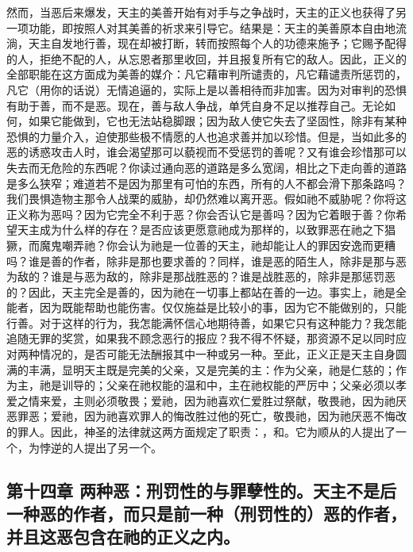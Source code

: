 然而，当恶后来爆发，天主的美善开始有对手与之争战时，天主的正义也获得了另一项功能，即按照人对其美善的祈求来引导它。结果是：天主的美善原本自由地流淌，天主自发地行善，现在却被打断，转而按照每个人的功德来施予；它赐予配得的人，拒绝不配的人，从忘恩者那里收回，并且报复所有它的敌人。因此，正义的全部职能在这方面成为美善的媒介：凡它藉审判所谴责的，凡它藉谴责所惩罚的，凡它（用你的话说）无情追逼的，实际上是以善相待而非加害。因为对审判的恐惧有助于善，而不是恶。现在，善与敌人争战，单凭自身不足以推荐自己。无论如何，如果它能做到，它也无法站稳脚跟；因为敌人使它失去了坚固性，除非有某种恐惧的力量介入，迫使那些极不情愿的人也追求善并加以珍惜。但是，当如此多的恶的诱惑攻击人时，谁会渴望那可以藐视而不受惩罚的善呢？又有谁会珍惜那可以失去而无危险的东西呢？你读过通向恶的道路是多么宽阔，相比之下走向善的道路是多么狭窄；难道若不是因为那里有可怕的东西，所有的人不都会滑下那条路吗？我们畏惧造物主那令人战栗的威胁，却仍然难以离开恶。假如祂不威胁呢？你将这正义称为恶吗？因为它完全不利于恶？你会否认它是善吗？因为它着眼于善？你希望天主成为什么样的存在？是否应该更愿意祂成为那样的，以致罪恶在祂之下猖獗，而魔鬼嘲弄祂？你会认为祂是一位善的天主，祂却能让人的罪因安逸而更糟吗？谁是善的作者，除非是那也要求善的？同样，谁是恶的陌生人，除非是那与恶为敌的？谁是与恶为敌的，除非是那战胜恶的？谁是战胜恶的，除非是那惩罚恶的？因此，天主完全是善的，因为祂在一切事上都站在善的一边。事实上，祂是全能者，因为既能帮助也能伤害。仅仅施益是比较小的事，因为它不能做别的，只能行善。对于这样的行为，我怎能满怀信心地期待善，如果它只有这种能力？我怎能追随无罪的奖赏，如果我不顾念恶行的报应？我不得不怀疑，那资源不足以同时应对两种情况的，是否可能无法酬报其中一种或另一种。至此，正义正是天主自身圆满的丰满，显明天主既是完美的父亲，又是完美的主：作为父亲，祂是仁慈的；作为主，祂是训导的；父亲在祂权能的温和中，主在祂权能的严厉中；父亲必须以孝爱之情来爱，主则必须敬畏；爱祂，因为祂喜欢仁爱胜过祭献，敬畏祂，因为祂厌恶罪恶；爱祂，因为祂喜欢罪人的悔改胜过他的死亡，敬畏祂，因为祂厌恶不悔改的罪人。因此，神圣的法律就这两方面规定了职责：，和。它为顺从的人提出了一个，为悖逆的人提出了另一个。\par


\subsection{第十四章 两种恶：刑罚性的与罪孽性的。天主不是后一种恶的作者，而只是前一种（刑罚性的）恶的作者，并且这恶包含在祂的正义之内。}

